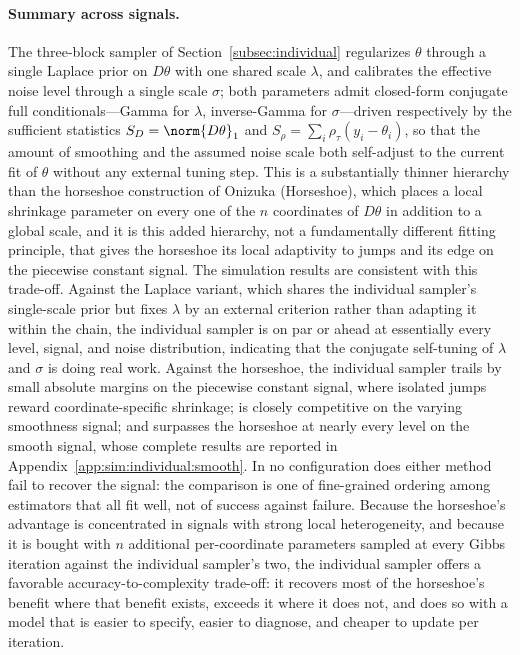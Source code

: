 \paragraph{Summary across signals.} The three-block sampler of Section~\ref{subsec:individual} regularizes $\theta$ through a single Laplace prior on $D\theta$ with one shared scale $\lambda$, and calibrates the effective noise level through a single scale $\sigma$; both parameters admit closed-form conjugate full conditionals---Gamma for $\lambda$, inverse-Gamma for $\sigma$---driven respectively by the sufficient statistics $S_D = \norm{D\theta}_1$ and $S_\rho = \sum_i \rho_\tau(y_i - \theta_i)$, so that the amount of smoothing and the assumed noise scale both self-adjust to the current fit of $\theta$ without any external tuning step. This is a substantially thinner hierarchy than the horseshoe construction of Onizuka (Horseshoe), which places a local shrinkage parameter on every one of the $n$ coordinates of $D\theta$ in addition to a global scale, and it is this added hierarchy, not a fundamentally different fitting principle, that gives the horseshoe its local adaptivity to jumps and its edge on the piecewise constant signal. The simulation results are consistent with this trade-off. Against the Laplace variant, which shares the individual sampler's single-scale prior but fixes $\lambda$ by an external criterion rather than adapting it within the chain, the individual sampler is on par or ahead at essentially every level, signal, and noise distribution, indicating that the conjugate self-tuning of $\lambda$ and $\sigma$ is doing real work. Against the horseshoe, the individual sampler trails by small absolute margins on the piecewise constant signal, where isolated jumps reward coordinate-specific shrinkage; is closely competitive on the varying smoothness signal; and surpasses the horseshoe at nearly every level on the smooth signal, whose complete results are reported in Appendix~\ref{app:sim:individual:smooth}. In no configuration does either method fail to recover the signal: the comparison is one of fine-grained ordering among estimators that all fit well, not of success against failure. Because the horseshoe's advantage is concentrated in signals with strong local heterogeneity, and because it is bought with $n$ additional per-coordinate parameters sampled at every Gibbs iteration against the individual sampler's two, the individual sampler offers a favorable accuracy-to-complexity trade-off: it recovers most of the horseshoe's benefit where that benefit exists, exceeds it where it does not, and does so with a model that is easier to specify, easier to diagnose, and cheaper to update per iteration.
